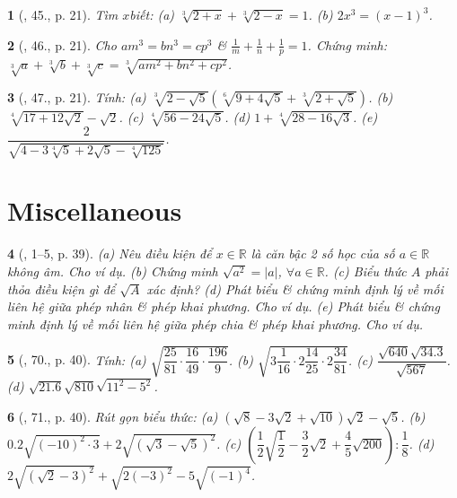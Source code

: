 \documentclass{article}
\newtheorem{baitoan}{}
\begin{document}
\begin{baitoan}[\cite{Binh_Toan_9_tap_1}, 45., p. 21]
	Tìm $x$biết: (a) $\sqrt[3]{2 + x} + \sqrt[3]{2 - x} = 1$. (b) $2x^3 = (x - 1)^3$.
\end{baitoan}

\begin{baitoan}[\cite{Binh_Toan_9_tap_1}, 46., p. 21]
	Cho $am^3 = bn^3 = cp^3$ \& $\frac{1}{m} + \frac{1}{n} + \frac{1}{p} = 1$. Chứng minh: $\sqrt[3]{a} + \sqrt[3]{b} + \sqrt[3]{c} = \sqrt[3]{am^2 + bn^2 + cp^2}$.
\end{baitoan}

\begin{baitoan}[\cite{Binh_Toan_9_tap_1}, 47., p. 21]
	Tính: (a) $\sqrt[3]{2 - \sqrt{5}}(\sqrt[6]{9 + 4\sqrt{5}} + \sqrt[3]{2 + \sqrt{5}})$. (b) $\sqrt[4]{17 + 12\sqrt{2}} - \sqrt{2}$. (c) $\sqrt[4]{56 - 24\sqrt{5}}$. (d) $1 + \sqrt[4]{28 - 16\sqrt{3}}$. (e) $\dfrac{2}{\sqrt{4 - 3\sqrt[4]{5} + 2\sqrt{5} - \sqrt[4]{125}}}$.
\end{baitoan}


\section{Miscellaneous}

\begin{baitoan}[\cite{SGK_Toan_9_tap_1}, 1--5, p. 39]
	(a) Nêu điều kiện để $x\in\mathbb{R}$ là căn bậc 2 số học của số $a\in\mathbb{R}$ không âm. Cho ví dụ. (b) Chứng minh $\sqrt{a^2} = |a|$, $\forall a\in\mathbb{R}$. (c) Biểu thức $A$ phải thỏa điều kiện gì để $\sqrt{A}$ xác định? (d) Phát biểu \& chứng minh định lý về mối liên hệ giữa phép nhân \& phép khai phương. Cho ví dụ. (e) Phát biểu \& chứng minh định lý về mối liên hệ giữa phép chia \& phép khai phương. Cho ví dụ.
\end{baitoan}

\begin{baitoan}[\cite{SGK_Toan_9_tap_1}, 70., p. 40]
	Tính: (a) $\sqrt{\dfrac{25}{81}\cdot\dfrac{16}{49}\cdot\dfrac{196}{9}}$. (b) $\sqrt{3\dfrac{1}{16}\cdot2\dfrac{14}{25}\cdot2\dfrac{34}{81}}$. (c) $\dfrac{\sqrt{640}\sqrt{34.3}}{\sqrt{567}}$. (d) $\sqrt{21.6}\sqrt{810}\sqrt{11^2 - 5^2}$.
\end{baitoan}

\begin{baitoan}[\cite{SGK_Toan_9_tap_1}, 71., p. 40]
	Rút gọn biểu thức: (a) $(\sqrt{8} - 3\sqrt{2} + \sqrt{10})\sqrt{2} - \sqrt{5}$. (b) $0.2\sqrt{(-10)^2\cdot3} + 2\sqrt{(\sqrt{3} - \sqrt{5})^2}$. (c) $\left(\dfrac{1}{2}\sqrt{\dfrac{1}{2}} - \dfrac{3}{2}\sqrt{2} + \dfrac{4}{5}\sqrt{200}\right):\dfrac{1}{8}$. (d) $2\sqrt{(\sqrt{2} - 3)^2} + \sqrt{2(-3)^2} - 5\sqrt{(-1)^4}$.
\end{baitoan}
\end{document}
